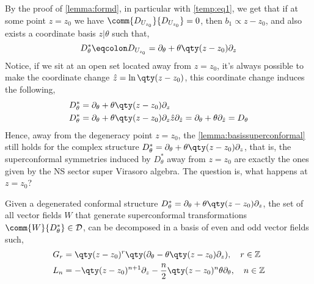 By the proof of \cref{lemma:formd}, in particular with \cref{temp:eq1}, we get that if at some point $z=z_0$ we have 
$\comm{D_{U_{z_0}}}{D_{U_{z_0}}}=0$, then $b_1\propto z-z_0$, and also exists a coordinate basis $z|\theta$ such that,
\[D^\ast_\theta\eqcolon D_{U_{z_0}}=\partial_\theta+\theta\qty(z-z_0)\partial_z\]
Notice, if we sit at an open set located away from $z=z_0$, it's always possible to make the coordinate change $\hat z=\ln\qty(z-z_0)$, 
this coordinate change induces the following,
\begin{align*}
    D^\ast_\theta&=\partial_\theta+\theta\qty(z-z_0)\partial_z\\
    D^\ast_\theta&=\partial_\theta+\theta\qty(z-z_0)\partial_z\hat z\partial_{\hat z}=\partial_\theta+\theta\partial_{\hat z}=D_\theta
\end{align*}
Hence, away from the degeneracy point $z=z_0$, the \cref{lemma:basissuperconformal} still holds for the complex structure 
$D^\ast_\theta=\partial_\theta+\theta\qty(z-z_0)\partial_z$, that is, the superconformal symmetries induced by $D^\ast_\theta$ 
away from $z=z_0$ are exactly the ones given by the NS sector super Virasoro algebra. The question is, what happens at $z=z_0$? 
\begin{lemma}
    Given a degenerated conformal structure $D^\ast_\theta=\partial_\theta+\theta\qty(z-z_0)\partial_z$, the set of all 
    vector fields $W$ that generate superconformal transformations $\comm{W}{D^\ast_\theta}\in\mathcal D$, 
    can be decomposed in a basis of even and odd vector fields such,
    \begin{align*}
        G_r&=\qty(z-z_0)^r\qty(\partial_\theta-\theta\qty(z-z_0)\partial_z),\ \ \ r\in\mathbb Z\\
        L_n&=-\qty(z-z_0)^{n+1}\partial_z-\frac n2 \qty(z-z_0)^n\theta\partial_\theta,\ \ \ n\in\mathbb Z
    \end{align*}
\end{lemma}
